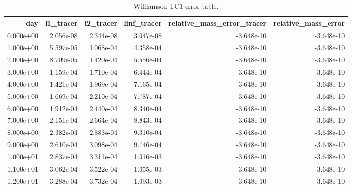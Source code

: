 \begin{table}[htbp]
\centering
{}
\begin{tabular}{rrrrrr}
\toprule
day & l1\_tracer & l2\_tracer & linf\_tracer & relative\_mass\_error\_tracer & relative\_mass\_error \\
\midrule
0.000e+00 & 2.056e-08 & 2.344e-08 & 3.047e-08 & -3.648e-10 & -3.648e-10 \\
1.000e+00 & 5.597e-05 & 1.068e-04 & 4.358e-04 & -3.648e-10 & -3.648e-10 \\
2.000e+00 & 8.709e-05 & 1.420e-04 & 5.556e-04 & -3.648e-10 & -3.648e-10 \\
3.000e+00 & 1.159e-04 & 1.710e-04 & 6.444e-04 & -3.648e-10 & -3.648e-10 \\
4.000e+00 & 1.421e-04 & 1.969e-04 & 7.165e-04 & -3.648e-10 & -3.648e-10 \\
5.000e+00 & 1.669e-04 & 2.210e-04 & 7.787e-04 & -3.648e-10 & -3.648e-10 \\
6.000e+00 & 1.912e-04 & 2.440e-04 & 8.340e-04 & -3.648e-10 & -3.648e-10 \\
7.000e+00 & 2.151e-04 & 2.664e-04 & 8.843e-04 & -3.648e-10 & -3.648e-10 \\
8.000e+00 & 2.382e-04 & 2.883e-04 & 9.310e-04 & -3.648e-10 & -3.648e-10 \\
9.000e+00 & 2.610e-04 & 3.098e-04 & 9.746e-04 & -3.648e-10 & -3.648e-10 \\
1.000e+01 & 2.837e-04 & 3.311e-04 & 1.016e-03 & -3.648e-10 & -3.648e-10 \\
1.100e+01 & 3.062e-04 & 3.522e-04 & 1.055e-03 & -3.648e-10 & -3.648e-10 \\
1.200e+01 & 3.288e-04 & 3.732e-04 & 1.093e-03 & -3.648e-10 & -3.648e-10 \\
\bottomrule
\end{tabular}
\caption{Williamson TC1 error table.}
\end{table}
